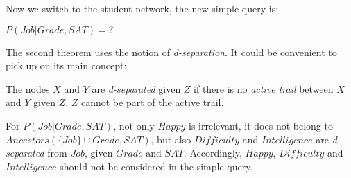 \begin{example}
    Now we switch to the student network, the new simple query is:
    \begin{center}
        $P(Job|Grade, SAT) = ?$
    \end{center} \vspace{3.5pt}
    The second theorem uses the notion of \textit{d-separation}. It could be convenient to pick up on its main concept: \vspace{3.5pt}
    \begin{center}
        The nodes $X$ and $Y$ are \textit{d-separated} given $Z$ if there is no \textit{active trail} between $X$ and $Y$ given $Z$. $Z$ cannot be part of the active trail.
    \end{center} \vspace{3.5pt}
    For $P(Job|Grade, SAT)$, not only $Happy$ is irrelevant, it does not belong to $Ancestors(\{Job\} \cup Grade, SAT)$, but also $Difficulty$ and $Intelligence$ are \textit{d-separated}
    from $Job$, given $Grade$ and $SAT$. Accordingly, $Happy$, $Difficulty$ and $Intelligence$ should not be considered in the simple query.
\end{example}
